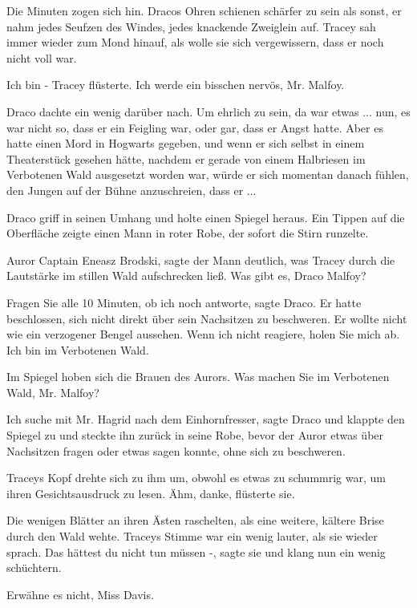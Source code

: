 Die Minuten zogen sich hin. Dracos Ohren schienen schärfer zu sein als sonst, er
nahm jedes Seufzen des Windes, jedes knackende Zweiglein auf. Tracey sah
immer wieder zum Mond hinauf, als wolle sie sich vergewissern, dass er
noch nicht voll war.

\glqq{}Ich bin -\grqq{} Tracey flüsterte. \glqq{}Ich werde ein bisschen nervös,
Mr. Malfoy.\grqq{}

Draco dachte ein wenig darüber nach. Um ehrlich zu sein, da war etwas ... nun,
es war nicht so, dass er ein Feigling war, oder gar, dass er Angst hatte.
Aber es hatte einen Mord in Hogwarts gegeben, und wenn er sich selbst in
einem Theaterstück gesehen hätte, nachdem er gerade von einem Halbriesen
im Verbotenen Wald ausgesetzt worden war, würde er sich momentan danach
fühlen, den Jungen auf der Bühne anzuschreien, dass er ...

Draco griff in seinen Umhang und holte einen Spiegel heraus. Ein Tippen auf die
Oberfläche zeigte einen Mann in roter Robe, der sofort die Stirn
runzelte.

\glqq{}Auror Captain Eneasz Brodski\grqq{}, sagte der Mann deutlich, was Tracey
durch die Lautstärke im stillen Wald aufschrecken ließ. \glqq{}Was gibt
es, Draco Malfoy?\grqq{}

\glqq{}Fragen Sie alle 10 Minuten, ob ich noch antworte\grqq{}, sagte Draco. Er
hatte beschlossen, sich nicht direkt über sein Nachsitzen zu beschweren.
Er wollte nicht wie ein verzogener Bengel aussehen. \glqq{}Wenn ich nicht
reagiere, holen Sie mich ab. Ich bin im Verbotenen Wald.\grqq{}

Im Spiegel hoben sich die Brauen des Aurors. \glqq{}Was machen Sie im Verbotenen
Wald, Mr. Malfoy?\grqq{}

\glqq{}Ich suche mit Mr. Hagrid nach dem Einhornfresser\grqq{}, sagte Draco und
klappte den Spiegel zu und steckte ihn zurück in seine Robe, bevor der
Auror etwas über Nachsitzen fragen oder etwas sagen konnte, ohne sich zu
beschweren.

Traceys Kopf drehte sich zu ihm um, obwohl es etwas zu schummrig war, um ihren
Gesichtsausdruck zu lesen. \glqq{}Ähm, danke\grqq{}, flüsterte sie.

Die wenigen Blätter an ihren Ästen raschelten, als eine weitere, kältere Brise
durch den Wald wehte. Traceys Stimme war ein wenig lauter, als sie wieder
sprach. \glqq{}Das hättest du nicht tun müssen -\grqq{}, sagte sie und
klang nun ein wenig schüchtern.

\glqq{}Erwähne es nicht, Miss Davis.\grqq{}


